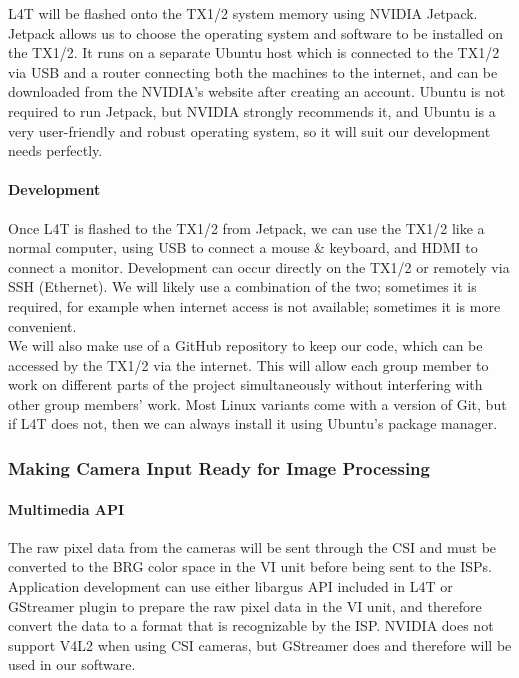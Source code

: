L4T will be flashed onto the TX1/2 system memory using NVIDIA Jetpack. Jetpack allows 
us to choose the operating system and software to be installed on the TX1/2. It runs on 
a separate Ubuntu host which is connected to the TX1/2 via USB and a router connecting 
both the machines to the internet, and can be downloaded from the NVIDIA's website 
after creating an account. Ubuntu is not required to run Jetpack, but NVIDIA strongly 
recommends it, and Ubuntu is a very user-friendly and robust operating system, so it 
will suit our development needs perfectly. \\

\paragraph{Development}

Once L4T is flashed to the TX1/2 from Jetpack, we can use the TX1/2 like a normal 
computer, using USB to connect a mouse \& keyboard, and HDMI to connect a monitor. 
Development can occur directly on the TX1/2 or remotely via SSH (Ethernet). We will 
likely use a combination of the two; sometimes it is required, for example when 
internet access is not available; sometimes it is more convenient. \\

We will also make use of a GitHub repository to keep our code, which can be accessed 
by the TX1/2 via the internet. This will allow each group member to work on different 
parts of the project simultaneously without interfering with other group members' 
work. Most Linux variants come with a version of Git, but if L4T does not, then we 
can always install it using Ubuntu's package manager. \\

\subsubsection{Making Camera Input Ready for Image Processing}

\paragraph{Multimedia API}

The raw pixel data from the cameras will be sent through the CSI and must be converted 
to the BRG color space in the VI unit before being sent to the ISPs. 
Application development can use either libargus API 
included in L4T or GStreamer plugin to prepare the raw pixel data in the VI unit, and 
therefore convert the data to a format that is recognizable by the ISP. NVIDIA does not 
support V4L2 when using CSI cameras, but GStreamer does and therefore will be used in 
our software.  \\

